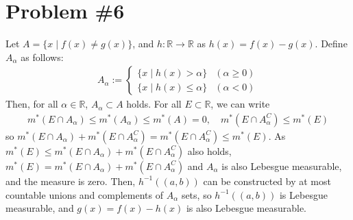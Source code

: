 \documentclass{scrartcl}
\begin{document}
\section{Problem \#6}
Let \(A = \{x\; |\; f(x) \not = g(x)\}\), and \(h: \mathbb{R} \to \mathbb{R}\)
as \(h(x) = f(x) - g(x)\). Define \(A_\alpha\) as follows:
\begin{align*}
  A_\alpha := \begin{cases}
    \{x\; |\; h(x) > \alpha\} & (\alpha \ge 0) \\
    \{x\; |\; h(x) \le \alpha\} & (\alpha < 0)
  \end{cases}
\end{align*}
Then, for all \(\alpha \in \mathbb{R}\), \(A_\alpha \subset A\) holds. For all
\(E \subset \mathbb{R}\), we can write
\begin{align*}
  m^*(E \cap A_\alpha)
  \le m^*(A_\alpha)
  \le m^*(A)
  = 0, \quad
  m^*(E \cap A_\alpha^C)
  \le m^*(E)
\end{align*}
so \(m^*(E \cap A_\alpha) + m^*(E \cap A^C_\alpha) = m^*(E \cap A^C_\alpha) \le
m^*(E)\). As \(m^*(E) \le m^*(E \cap A_\alpha) + m^*(E \cap A^C_\alpha)\) also
holds, \(m^*(E) = m^*(E \cap A_\alpha) + m^*(E \cap A^C_\alpha)\) and
\(A_\alpha\) is also Lebesgue measurable, and the measure is zero. Then,
\(h^{-1}((a, b))\) can be constructed by at most countable unions and
complements of \(A_\alpha\) sets, so \(h^{-1}((a, b))\) is Lebesgue measurable,
and \(g(x) = f(x) - h(x)\) is also Lebesgue measurable.
\end{document}
